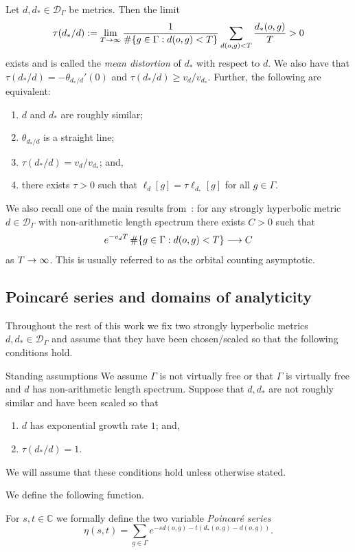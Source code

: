 \documentclass[AHL,Unicode,longabstracts,published]{cedram}
\newcommand{\G}{\Gamma}
\newcommand{\Dc}{\mathcal{D}}
\newcommand{\C}{\mathbb{C}}
\let\originalleft\left
\let\originalright\right
\renewcommand{\left}{\mathopen{}\mathclose\bgroup\originalleft}
\renewcommand{\right}{\aftergroup\egroup\originalright}
\renewcommand*{\to}{\mathchoice{\longrightarrow}{\rightarrow}{\rightarrow}{\rightarrow}}
\theoremstyle{plain}
\newcommand{\G}{\Gamma}
\begin{document}
\begin{theo}\label{thm.equiv}
Let $d,d_\ast \in \Dc_\G$ be metrics. Then the limit
\[
\tau(d_\ast/d) := \lim_{T\to\infty} \frac{1}{\#\left\{g\in\G: d(o,g) <T\right\}} \sum_{d(o,g) < T} \frac{d_\ast(o,g)}{T} > 0
\]
exists and is called the \emph{mean distortion} of $d_\ast$ with respect to $d$. We also have that $\tau(d_\ast/d) = - \theta_{d_\ast/d}'(0)$ and $\tau(d_\ast/d) \ge v_d/v_{d_\ast}$. Further, the following are equivalent:
\begin{enumerate}
\item\label{theo2.7.1} $d$ and $d_\ast$ are roughly similar;
\item\label{theo2.7.2} $\theta_{d_\ast/d}$ is a straight line;
\item\label{theo2.7.3} $\tau(d_\ast/d) = v_d/v_{d_\ast}$; and,
\item\label{theo2.7.4} there exists $\tau > 0$ such that $\ell_d[g] = \tau \ell_{d_\ast}[g]$ for all $g \in \G$.
\end{enumerate}
\end{theo}

We also recall one of the main results from~\cite{cantrell}: for any strongly hyperbolic metric $d \in \Dc_\G$ with non-arithmetic length spectrum there exists $C > 0$ such that
\[
e^{- v_d T} \, \#\left\{ g \in \G: d(o,g) < T\right\} \to C
\]
as $T\to\infty$. This is usually referred to as the orbital counting asymptotic.


\subsection{Poincaré series and domains of analyticity}\label{sec.analytic}
Throughout the rest of this work we fix two strongly hyperbolic metrics $d,d_\ast \in \Dc_\G$ and assume that they have been chosen/scaled so that the following conditions hold.

\begin{enonce*}[plain]{Standing assumptions}
We assume $\G$ is not virtually free or that $\G$ is virtually free and $d$ has non-arithmetic length spectrum. Suppose that $d,d_\ast$ are not roughly similar and have been scaled so that
\begin{enumerate}
\item $d$ has exponential growth rate $1$; and,
\item $\tau(d_\ast/d) = 1$.
\end{enumerate}
We will assume that these conditions hold unless otherwise stated.
\end{enonce*}
We define the following function.
\begin{defi}
For $s, t \in \C$ we formally define the two variable \emph{Poincaré series}
\[
\eta(s,t) = \sum_{g\in\G} e^{-sd(o,g) - t(d_\ast(o,g) - d(o,g))}.
\]
\end{defi}
\end{document}
